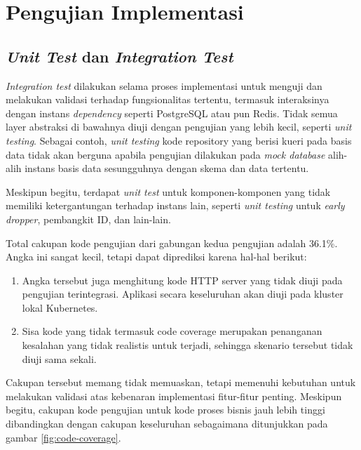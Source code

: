 \chapter{Pengujian Implementasi}
\label{apx:implementation-test}

\section{\textit{Unit Test} dan \textit{Integration Test}}

\textit{Integration test} dilakukan selama proses implementasi untuk menguji dan melakukan validasi terhadap fungsionalitas tertentu, termasuk interaksinya dengan instans \textit{dependency} seperti PostgreSQL atau pun Redis. Tidak semua layer abstraksi di bawahnya diuji dengan pengujian yang lebih kecil, seperti \textit{unit testing}. Sebagai contoh, \textit{unit testing} kode repository yang berisi kueri pada basis data tidak akan berguna apabila pengujian dilakukan pada \textit{mock database} alih-alih instans basis data sesungguhnya dengan skema dan data tertentu.

Meskipun begitu, terdapat \textit{unit test} untuk komponen-komponen yang tidak memiliki ketergantungan terhadap instans lain, seperti \textit{unit testing} untuk \textit{early dropper}, pembangkit ID, dan lain-lain.

Total cakupan kode pengujian dari gabungan kedua pengujian adalah 36.1\%. Angka ini sangat kecil, tetapi dapat diprediksi karena hal-hal berikut:

\begin{enumerate}
    \item Angka tersebut juga menghitung kode HTTP server yang tidak diuji pada pengujian terintegrasi. Aplikasi secara keseluruhan akan diuji pada kluster lokal Kubernetes.
    \item Sisa kode yang tidak termasuk code coverage merupakan penanganan kesalahan yang tidak realistis untuk terjadi, sehingga skenario tersebut tidak diuji sama sekali.
\end{enumerate}

Cakupan tersebut memang tidak memuaskan, tetapi memenuhi kebutuhan untuk melakukan validasi atas kebenaran implementasi fitur-fitur penting. Meskipun begitu, cakupan kode pengujian untuk kode proses bisnis jauh lebih tinggi dibandingkan dengan cakupan keseluruhan sebagaimana ditunjukkan pada gambar \ref{fig:code-coverage}.

